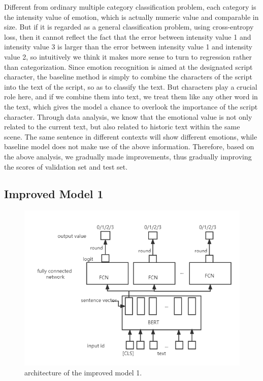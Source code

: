 \documentclass[12pt,twocolumn,letterpaper]{article}
\begin{document}
Different from ordinary multiple category classification problem, each category is the intensity value of emotion, which is actually numeric value and comparable in size. But if it is regarded as a general classification problem, using cross-entropy loss, then it cannot reflect the fact that the error between intensity value 1 and intensity value 3 is larger than the error between intensity value 1 and intensity value 2, so intuitively we think it makes more sense to turn to regression rather than categorization.  
Since emotion recognition is aimed at the designated script character, the baseline method is simply to combine the characters of the script into the text of the script, so as to classify the text. But characters play a crucial role here, and if we combine them into text, we treat them like any other word in the text, which gives the model a chance to overlook the importance of the script character.  
Through data analysis, we know that the emotional value is not only related to the current text, but also related to historic text within the same scene. The same sentence in different contexts will show different emotions, while baseline model does not make use of the above information.  
Therefore, based on the above analysis, we gradually made improvements, thus gradually improving the scores of validation set and test set.    


\subsection{Improved Model 1}
\begin{figure}
\begin{center}
\includegraphics[scale=0.5]{Method2.png}
\end{center}
   \caption{architecture of the improved model 1.}
\label{fig:short}
\end{figure}
\end{document}
